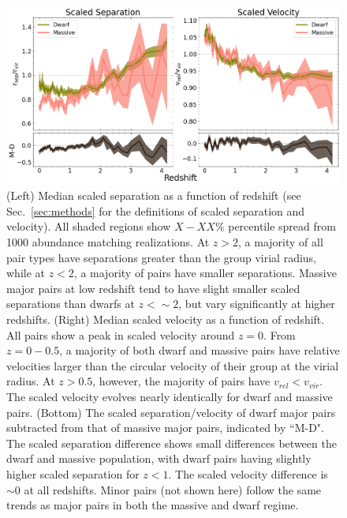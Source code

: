 \documentclass[twocolumn]{aastex631}
\begin{document}
    \begin{figure}[htp]
      \centering
      \includegraphics[width=\textwidth]{scaledcombo_1000.png}
      \caption{ \label{fig:scaled}
          (Left) Median scaled separation as a function of redshift (see Sec.~\ref{sec:methods} for the definitions of scaled separation and velocity). All shaded regions show $X-XX\%$ percentile spread from 1000 abundance matching realizations. 
          At $z>2$, a majority of all pair types have separations greater than the group virial radius, while at $z<2$, a majority of pairs have smaller separations.  
          Massive major pairs at low redshift tend to have slight smaller scaled separations than dwarfs at $z<\sim2$, but vary significantly at higher redshifts. 
          (Right) Median scaled velocity as a function of redshift.
          All pairs show a peak in scaled velocity around $z=0$. From $z=0-0.5$, a majority of both dwarf and massive pairs have relative velocities larger than the circular velocity of their group at the virial radius. At $z>0.5$, however, the majority of pairs have $v_{rel}<v_{vir}$. The scaled velocity evolves nearly identically for dwarf and massive pairs.
          (Bottom) The scaled separation/velocity of dwarf major pairs subtracted from that of massive major pairs, indicated by ``M-D".
          The scaled separation difference shows small differences between the dwarf and massive population, with dwarf pairs having slightly higher scaled separation for $z<1$. The scaled velocity difference is $\sim0$ at all redshifts.
          Minor pairs (not shown here) follow the same trends as major pairs in both the massive and dwarf regime.}
    \end{figure}
    
\end{document}
